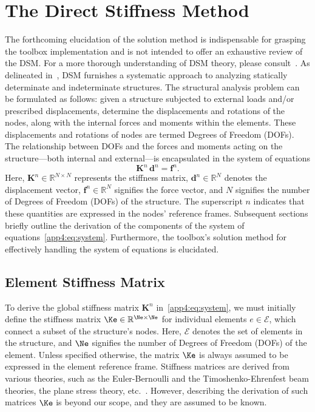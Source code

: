 
\section{The Direct Stiffness Method}
\label{app4:sec:solution_method}

The forthcoming elucidation of the solution method is indispensable for grasping the toolbox implementation and is not intended to offer an exhaustive review of the \ac{DSM}. For a more thorough understanding of \ac{DSM} theory, please consult~\cite{turner1959direct, turner1964further, logan2002first, hutton2004fundamentals}. As delineated in~\cite{samuelsson2006history}, \ac{DSM} furnishes a systematic approach to analyzing statically determinate and indeterminate structures. The structural analysis problem can be formulated as follows: given a structure subjected to external loads and/or prescribed displacements, determine the displacements and rotations of the nodes, along with the internal forces and moments within the elements. These displacements and rotations of nodes are termed Degrees of Freedom (\acp{DOF}). The relationship between \acp{DOF} and the forces and moments acting on the structure—both internal and external—is encapsulated in the system of equations
%
\begin{equation}
  \label{app4:eq:system}
  \mathbf{K}^{n} \, \mathbf{d}^{n} = \mathbf{f}^{n}.
\end{equation}
%
Here, $\mathbf{K}^{n} \in \mathbb{R}^{N \times N}$ represents the stiffness matrix, $\mathbf{d}^{n} \in \mathbb{R}^{N}$ denotes the displacement vector, $\mathbf{f}^{n} \in \mathbb{R}^{N}$ signifies the force vector, and $N$ signifies the number of Degrees of Freedom (\acp{DOF}) of the structure. The superscript $n$ indicates that these quantities are expressed in the nodes' reference frames. Subsequent sections briefly outline the derivation of the components of the system of equations~\eqref{app4:eq:system}. Furthermore, the toolbox's solution method for effectively handling the system of equations is elucidated.

\subsection{Element Stiffness Matrix}

To derive the global stiffness matrix $\mathbf{K}^{n}$ in~\eqref{app4:eq:system}, we must initially define the stiffness matrix $\Ke \in \mathbb{R}^{\Ne \times \Ne}$ for individual elements $e \in \mathcal{E}$, which connect a subset of the structure's nodes. Here, $\mathcal{E}$ denotes the set of elements in the structure, and $\Ne$ signifies the number of Degrees of Freedom (\acp{DOF}) of the element. Unless specified otherwise, the matrix $\Ke$ is always assumed to be expressed in the element reference frame. Stiffness matrices are derived from various theories, such as the Euler-Bernoulli and the Timoshenko-Ehrenfest beam theories, the plane stress theory, etc.~\cite{hutton2004fundamentals}. However, describing the derivation of such matrices $\Ke$ is beyond our scope,
and they are assumed to be known.

